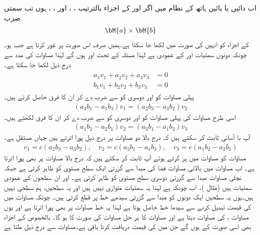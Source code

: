 اب دائیں یا بائیں ہاتھ کے نظام میں اگر  اور  کے اجزاء بالترتیب ، ،  اور ، ،  ہوں تب سمتی ضرب 
\begin{align*}
\bM{a}\times \bM{b}
\end{align*}
کے اجزاء کو انہیں کی صورت میں لکھا جا سکتا ہے۔ہمیں صرف اس صورت پر غور کرنا ہے جب  ہو۔چونکہ  دونوں سمتیات  اور  کے عمودی ہے لہٰذا مسئلہ  کے تحت  اور  ہوں گے لہٰذا مساوات  کی مدد سے درج ذیل لکھا جا سکتا ہے۔
\begin{gather}
\begin{aligned}\label{مساوات_الجبرا_سمتی_ضرب_اجزاء_کی_صورت_الف}
a_1v_1+a_2v_2+a_3v_3&=0\\
b_1v_1+b_2v_2+b_3v_3&=0
\end{aligned}
\end{gather}
پہلی مساوات کو  اور دوسری کو  سے ضرب دے کر ان کا فرق حاصل کرتے ہیں۔
\begin{align*}
(a_3b_1-a_1b_3)v_1=(a_2b_3-a_3b_2)v_2
\end{align*}
اسی طرح مساوات  کی پہلی مساوات کو  اور دوسری کو  سے ضرب دے کر ان کا فرق  لکھتے ہیں۔ 
\begin{align*}
(a_1b_2-a_2b_1)v_2=(a_3b_1-a_1b_3)v_3
\end{align*}
آپ با آسانی ثابت کر سکتے ہیں کہ درج بالا دو مساوات پر درج ذیل  پورا اترتے ہیں جہاں  مستقل ہے۔
\begin{align}\label{مساوات_الجبرا_سمتی_ضرب_اجزاء_کی_صورت_ب}
v_1=c(a_2b_3-a_3b_2),\quad v_2=c(a_3b_1-a_1b_3),\quad v_3=c(a_1b_2-a_2b_1)
\end{align}
مساوات  کو مساوات  میں پر کرتے ہوئے آپ ثابت کر سکتے ہیں کہ  درج بالا مساوات  پر بھی پورا اترتا ہے۔ اب مساوات  میں بالائی  مساوات   فضا کی مبدا سے گزرتی ایک سطح مستوی کو ظاہر کرتی ہے جبکہ نچلی مساوات مبدا سے گزرتی دوسری سطح مستوی کو ظاہر کرتی ہے۔ اور  ان سطحوں کے عمودی سمتیات ہیں (مثال )۔ اب چونکہ  ہے لہٰذا یہ سمتیات متوازی نہیں ہیں اور یہ سطحیں، ہم سطحی نہیں ہیں۔یوں یہ سطحیں  ایک دونوں کو مبدا سے گزرتی سیدھے خط  پر قطع کرتی ہیں۔ چونکہ مساوات  میں  کی قیمت تبدیل کرنے سے سیدھا خط حاصل ہوتا ہے لہٰذا  یہ خط مساوات  پر بھی پورا اترتا ہے  اور یوں مساوات ،  کی مساوات دیتا ہے اور مساوات  کا ہر حل مساوات  کی صورت کا ہو گا۔ بالخصوص  کے اجزاء بھی اسی صورت کے ہوں گے جن میں  کی قیمت دریافت کرنا باقی ہے۔مساوات  سے درج ذیل ملتا ہے

